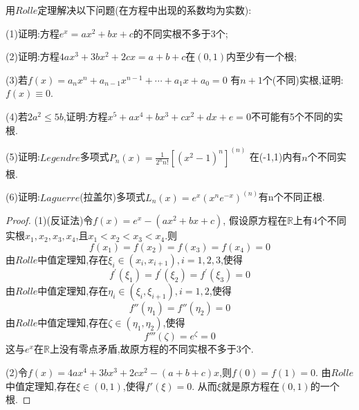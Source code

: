 \documentclass[lang=cn,newtx,10pt,scheme=chinese]{../Template/elegantbook}
\begin{document}
\begin{exercise}\label{(ex:2.2)}
    用$Rolle$定理解决以下问题(在方程中出现的系数均为实数):

(1)证明:方程$e^x=ax^2+bx+c$的不同实根不多于3个;

(2)证明:方程$4ax^3+3bx^2+2cx=a+b+c$在$(0,1)$内至少有一个根;

(3)若$f\left( x \right) =a_nx^n+a_{n-1}x^{n-1}+\cdots +a_1x+a_0=0$
有$n+1$个(不同)实根,证明:$f(x)\equiv 0$.

(4)若$2a^2\le 5b$,证明:方程$x^5+ax^4+bx^3+cx^2+dx+e=0$不可能有5个不同的实根.

(5)证明:$Legendre$多项式$P_n\left( x \right) =\frac{1}{2^nn!}\left[ \left( x^2-1 \right) ^n \right] ^{\left( n \right)}$
在(-1,1)内有$n$个不同实根.

(6)证明:$Laguerre$(拉盖尔)多项式$L_n\left( x \right) =e^x\left( x^ne^{-x} \right) ^{\left( n \right)}$有n个不同正根.

\begin{proof}
    (1)(反证法)令$f(x)=e^x-(ax^2+bx+c)$,
    假设原方程在$\mathbb{R}$上有4个不同实根$x_1,x_2,x_3,x_4$,且$x_1<x_2<x_3<x_4$.则
    \begin{equation}
        f(x_1)=f(x_2)=f(x_3)=f(x_4)=0
        \nonumber
    \end{equation}
    由$Rolle$中值定理知,存在$\xi_i\in(x_i,x_{i+1}),i=1,2,3$,使得
    \begin{equation}
        f^{\prime}(\xi_1)=f^{\prime}(\xi_2)=f^{\prime}(\xi_3)=0
        \nonumber
    \end{equation}
    由$Rolle$中值定理知,存在$\eta_i\in(\xi_i,\xi_{i+1}),i=1,2$,使得
    \begin{equation}
        f''(\eta_1)=f''(\eta_2)=0
        \nonumber
    \end{equation}
    由$Rolle$中值定理知,存在$\zeta\in(\eta_1,\eta_2)$,使得
    \begin{equation}
        f'''(\zeta)=e^\zeta=0
        \nonumber
    \end{equation}
    这与$e^x$在$\mathbb{R}$上没有零点矛盾,故原方程的不同实根不多于3个.

    (2)令$f(x)=4ax^4+3bx^3+2cx^2-(a+b+c)x$,则$f(0)=f(1)=0$.
    由$Rolle$中值定理知,存在$\xi\in(0,1)$,使得$f'(\xi)=0$.
    从而$\xi$就是原方程在$(0,1)$的一个根.


\end{proof}
\end{exercise}
\end{document}
